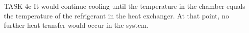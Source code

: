 TASK 4e  
It would continue cooling until the temperature in the chamber equals the temperature of the refrigerant in the heat exchanger. At that point, no further heat transfer would occur in the system.